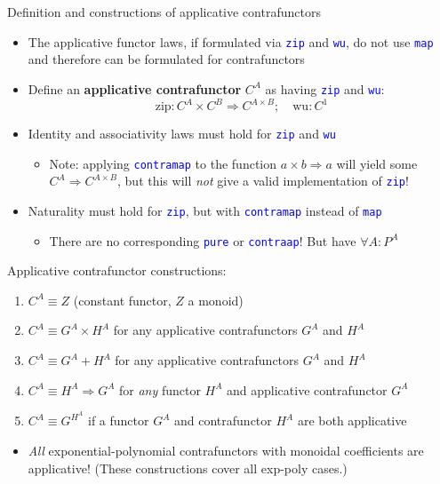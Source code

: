 \documentclass[english]{beamer}
\begin{document}
\begin{frame}{Definition and constructions of applicative contrafunctors}
\begin{itemize}
\item \vspace{-0.2cm}The applicative functor laws, if formulated via \texttt{\textcolor{blue}{\footnotesize{}zip}}
and \texttt{\textcolor{blue}{\footnotesize{}wu}}, do not use \texttt{\textcolor{blue}{\footnotesize{}map}}
and therefore can be formulated for contrafunctors
\item Define an \textbf{applicative contrafunctor} $C^{A}$ as having \texttt{\textcolor{blue}{\footnotesize{}zip}}
and \texttt{\textcolor{blue}{\footnotesize{}wu}}:{\footnotesize{}
\[
\text{zip}:C^{A}\times C^{B}\Rightarrow C^{A\times B};\quad\text{wu}:C^{1}
\]
}{\footnotesize \par}
\item Identity and associativity laws must hold for \texttt{\textcolor{blue}{\footnotesize{}zip}}
and \texttt{\textcolor{blue}{\footnotesize{}wu}} 
\begin{itemize}
\item Note: applying \texttt{\textcolor{blue}{\footnotesize{}contramap}}
to the function $a\times b\Rightarrow a$ will yield some $C^{A}\Rightarrow C^{A\times B}$,
but this will \emph{not} give a valid implementation of \texttt{\textcolor{blue}{\footnotesize{}zip}}!
\end{itemize}
\item Naturality must hold for \texttt{\textcolor{blue}{\footnotesize{}zip}},
but with \texttt{\textcolor{blue}{\footnotesize{}contramap}} instead
of \texttt{\textcolor{blue}{\footnotesize{}map}} 
\begin{itemize}
\item There are no corresponding \texttt{\textcolor{blue}{\footnotesize{}pure}}
or \texttt{\textcolor{blue}{\footnotesize{}contraap}}! But have $\forall A:P^{A}$
\end{itemize}
\end{itemize}
Applicative contrafunctor constructions:
\begin{enumerate}
\item $C^{A}\equiv Z$ (constant functor, $Z$ a monoid)
\item $C^{A}\equiv G^{A}\times H^{A}$ for any applicative contrafunctors
$G^{A}$ and $H^{A}$
\item $C^{A}\equiv G^{A}+H^{A}$ for any applicative contrafunctors $G^{A}$
and $H^{A}$
\item $C^{A}\equiv H^{A}\Rightarrow G^{A}$ for \emph{any} functor $H^{A}$
and applicative contrafunctor $G^{A}$
\item $C^{A}\equiv G^{H^{A}}$ if a functor $G^{A}$ and contrafunctor $H^{A}$
are both applicative
\end{enumerate}
\begin{itemize}
\item \emph{All} exponential-polynomial contrafunctors with monoidal coefficients
are applicative! (These constructions cover all exp-poly cases.)
\end{itemize}
\end{frame}
\end{document}
